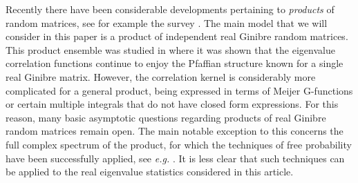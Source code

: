 \documentclass[11pt,reqno]{amsproc}
\numberwithin{equation}{section}
\numberwithin{theorem}{section}
\begin{document}
Recently there have been considerable developments pertaining to \textit{products} of random matrices, see for example the survey \cite{AI15}. The main model that we will consider in this paper is a product of independent real Ginibre random matrices. This product ensemble was studied in \cite{IK14, FI16} where it was shown that the eigenvalue correlation functions continue to enjoy the Pfaffian structure known for a single real Ginibre matrix. However, the correlation kernel is considerably more complicated for a general product, being expressed in terms of Meijer G-functions or certain multiple integrals that do not have closed form expressions. For this reason, many basic asymptotic questions regarding products of real Ginibre random matrices remain open. The main notable exception to this concerns the full complex spectrum of the product, for which the techniques of free probability have been successfully applied, see \textit{e.g.} \cite{BJW10, BNS12}. It is less clear that such techniques can be applied to the real eigenvalue statistics considered in this article.
\end{document}
